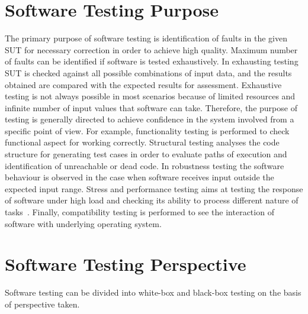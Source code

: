 \section{Software Testing Purpose}
The primary purpose of software testing is identification of faults in the given SUT for necessary correction in order to achieve high quality. Maximum number of faults can be identified if software is tested exhaustively. In exhausting testing SUT is checked against all possible combinations of input data, and the results obtained are compared with the expected results for assessment. Exhaustive testing is not always possible in most scenarios because of limited resources and infinite number of input values that software can take. Therefore, the purpose of testing is generally directed to achieve confidence in the system involved from a specific point of view. For example, functionality testing is performed to check functional aspect for working correctly. Structural testing analyses the code structure for generating test cases in order to evaluate paths of execution and identification of unreachable or dead code. In robustness testing the software behaviour is observed in the case when software receives input outside the expected input range. Stress and performance testing aims at testing the response of software under high load and checking its ability to process different nature of tasks~\cite{cohen2005robustness}. Finally, compatibility testing is performed to see the interaction of software with underlying operating system.

\section{Software Testing Perspective}
Software testing can be divided into white-box and black-box testing on the basis of perspective taken. 

